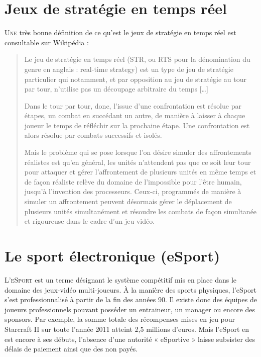 \section{Jeux de stratégie en temps réel}%
\label{sec:jeux_de_strategie_en_temps_reel}

\lettrine{U}{ne} très bonne définition de ce qu'est le jeux de stratégie en
temps réel est consultable sur Wikipédia :

\begin{quote}

Le jeu de stratégie en temps réel (STR, ou RTS pour la
dénomination du genre en anglais : real-time strategy) est un type de
jeu de stratégie particulier qui notamment, et par opposition au jeu de
stratégie au tour par tour, n’utilise pas un découpage arbitraire du
temps [\ldots]

Dans le tour par tour, donc, l'issue d’une confrontation est résolue par
étapes, un combat en succédant un autre, de manière à laisser à chaque
joueur le temps de réfléchir sur la prochaine étape. Une confrontation
est alors résolue par combats successifs et isolés.

Mais le problème qui se pose lorsque l'on désire simuler des affrontements
réalistes est qu’en général, les unités n’attendent pas que ce soit leur
tour pour attaquer et gérer l'affrontement de plusieurs unités en même
temps et de façon réaliste relève du domaine de l'impossible pour l'être
humain, jusqu'à l'invention des processeurs. Ceux-ci, programmés de
manière à simuler un affrontement peuvent désormais gérer le déplacement
de plusieurs unités simultanément et résoudre les combats de façon
simultanée et rigoureuse dans le cadre d’un jeu vidéo.

\end{quote}

\section{Le sport électronique (eSport)}%
\label{sec:le_sport_electronique_esport_}

\lettrine{L}{’eSport} est un terme désignant le
système compétitif mis en place dans le domaine des jeux-vidéo
multi-joueurs. À la manière des sports physiques, l'eSport s’est
professionnalisé à partir de la fin des années 90. Il existe donc des
équipes de joueurs professionnels pouvant posséder un entraineur, un
manager ou encore des sponsors. Par exemple, la somme totale des
récompenses mises en jeu pour Starcraft II sur toute l’année 2011 atteint
2,5 millions d’euros.  Mais l'eSport en est encore à ses débuts,
l'absence d'une autorité « eSportive » laisse subsister des délais de
paiement ainsi que des non payés.


